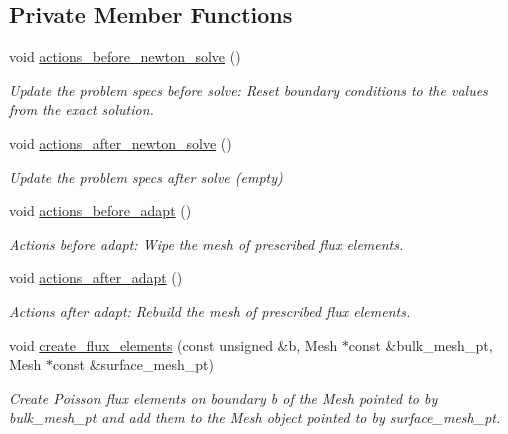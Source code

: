 \subsection*{Private Member Functions}
\begin{DoxyCompactItemize}
\item 
void \hyperlink{classRefineableTwoMeshFluxPoissonProblem_a209506229c491a8cec4e1dce387e18c3}{actions\+\_\+before\+\_\+newton\+\_\+solve} ()
\begin{DoxyCompactList}\small\item\em Update the problem specs before solve\+: Reset boundary conditions to the values from the exact solution. \end{DoxyCompactList}\item 
void \hyperlink{classRefineableTwoMeshFluxPoissonProblem_ab8b04db3dab6297f609a9a028b1c4473}{actions\+\_\+after\+\_\+newton\+\_\+solve} ()
\begin{DoxyCompactList}\small\item\em Update the problem specs after solve (empty) \end{DoxyCompactList}\item 
void \hyperlink{classRefineableTwoMeshFluxPoissonProblem_a10d2a67a5ac599161ddcf876b31334f6}{actions\+\_\+before\+\_\+adapt} ()
\begin{DoxyCompactList}\small\item\em Actions before adapt\+: Wipe the mesh of prescribed flux elements. \end{DoxyCompactList}\item 
void \hyperlink{classRefineableTwoMeshFluxPoissonProblem_a0140155529861f5e63ab32feece3c9b6}{actions\+\_\+after\+\_\+adapt} ()
\begin{DoxyCompactList}\small\item\em Actions after adapt\+: Rebuild the mesh of prescribed flux elements. \end{DoxyCompactList}\item 
void \hyperlink{classRefineableTwoMeshFluxPoissonProblem_ac2eaf11cfc4dda41f97cacc2a1a1f86e}{create\+\_\+flux\+\_\+elements} (const unsigned \&b, Mesh $\ast$const \&bulk\+\_\+mesh\+\_\+pt, Mesh $\ast$const \&surface\+\_\+mesh\+\_\+pt)
\begin{DoxyCompactList}\small\item\em Create Poisson flux elements on boundary b of the Mesh pointed to by bulk\+\_\+mesh\+\_\+pt and add them to the Mesh object pointed to by surface\+\_\+mesh\+\_\+pt. \end{DoxyCompactList}\item 

\end{DoxyCompactItemize}

